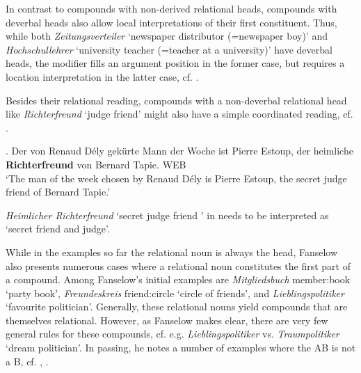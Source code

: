 In contrast to compounds with non-derived relational heads, compounds
with deverbal heads also allow local interpretations of their first
constituent. 
Thus, while both \emph{Zeitungsverteiler}  `newspaper distributor (=newspaper boy)' and
\emph{Hochschul\-lehrer}  `university teacher (=teacher at a university)' have deverbal heads, the modifier fills an argument position in the former case, but requires a location interpretation in the latter case, cf. \citet[93--94]{Fanselow:1981}.

\noger
{}
Besides their relational reading, compounds with a non-deverbal relational head like
\emph{Richterfreund} `judge friend' might also have a simple coordinated reading,
cf. \Next.

\ex. \label{ex:richterfreund}
\ger
Der von Renaud D\'ely gekürte \glqq Mann der Woche \grqq {} ist Pierre
Estoup, der heimliche \textbf{Richterfreund} von Bernard Tapie. WEB\\
`The man of the week chosen by Renaud D\'ely is Pierre Estoup, the
secret judge friend of Bernard Tapie.'
\noger

\emph{Heimlicher Richterfreund} `secret judge friend ' in \Last needs
to be interpreted as `secret friend and judge'.

While in the examples so far the relational noun is always the head, Fanselow also presents
numerous cases where a relational noun constitutes the first part of a
compound. 
Among Fanselow's initial examples are 
\emph{Mitgliedsbuch} member:book `party book', \emph{Freundeskreis} friend:circle `circle of friends', and
\emph{Lieblings\-politiker} `favourite politician'. Generally, these relational nouns yield
com\-pounds that are themselves relational. However, as Fanselow makes clear, there are very
few general rules for these compounds,
cf. e.g. \emph{Lieblingspolitiker} vs. \emph{Traumpolitiker} `dream politician'. In
passing, he notes a number of examples where the AB is not a B,
cf. \Next, \citet[104]{Fanselow:1981}. 

